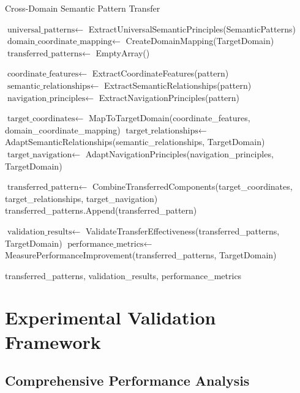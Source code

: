 \documentclass[12pt,a4paper]{article}
\begin{document}
\begin{algorithm}[H]
\caption{Cross-Domain Semantic Pattern Transfer}
\label{alg:semantic_transfer}
\begin{algorithmic}[1]
    \State $\text{universal\_patterns} \gets$ ExtractUniversalSemanticPrinciples(SemanticPatterns)
    \State $\text{domain\_coordinate\_mapping} \gets$ CreateDomainMapping(TargetDomain)
    \State $\text{transferred\_patterns} \gets$ EmptyArray()
    
        \State $\text{coordinate\_features} \gets$ ExtractCoordinateFeatures(pattern)
        \State $\text{semantic\_relationships} \gets$ ExtractSemanticRelationships(pattern)
        \State $\text{navigation\_principles} \gets$ ExtractNavigationPrinciples(pattern)
        
        \State $\text{target\_coordinates} \gets$ MapToTargetDomain(coordinate\_features, domain\_coordinate\_mapping)
        \State $\text{target\_relationships} \gets$ AdaptSemanticRelationships(semantic\_relationships, TargetDomain)
        \State $\text{target\_navigation} \gets$ AdaptNavigationPrinciples(navigation\_principles, TargetDomain)
        
        \State $\text{transferred\_pattern} \gets$ CombineTransferredComponents(target\_coordinates, target\_relationships, target\_navigation)
        \State transferred\_patterns.Append(transferred\_pattern)
    \EndFor
    
    \State $\text{validation\_results} \gets$ ValidateTransferEffectiveness(transferred\_patterns, TargetDomain)
    \State $\text{performance\_metrics} \gets$ MeasurePerformanceImprovement(transferred\_patterns, TargetDomain)
    
    \State \Return transferred\_patterns, validation\_results, performance\_metrics
\EndProcedure
\end{algorithmic}
\end{algorithm}

\section{Experimental Validation Framework}

\subsection{Comprehensive Performance Analysis}
\end{document}
